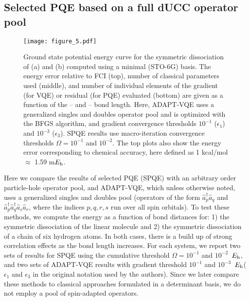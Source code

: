 \documentclass[aps,prx, reprint]{revtex4-2}
\newcommand*{\Eh}{$E_{\rm h}$\xspace}
\newcommand{\cop}[1]{\hat{a}^{\dagger}_{#1}}
\newcommand{\aop}[1]{\hat{a}_{#1}}
\begin{document}
\subsection{Selected PQE based on a full dUCC operator pool}
\begin{figure*}[ht!]
\centering
\texttt{[image: figure\_5.pdf]}
\caption{Ground state potential energy curve for the symmetric dissociation of (a)  and (b)  computed using a minimal (STO-6G) basis. The energy error relative to FCI (top), number of classical parameters used (middle), and number of individual elements of the gradient (for VQE) or residual (for PQE) evaluated (bottom) are given as a function of the -- and -- bond length. Here, ADAPT-VQE uses a generalized singles and doubles operator pool and is optimized with the BFGS algorithm, and gradient convergence thresholds $10^{-1}$ ($\epsilon_1$) and $10^{-3}$ ($\epsilon_3$). SPQE results use macro-iteration convergence thresholds $\Omega=10^{-1}$ and $10^{-2}$. The top plots also show the energy error corresponding to chemical accuracy, here defined as 1 kcal/mol $\approx$ 1.59 m\Eh.}
\label{fig:H6_BeH2_pes_compare}
\end{figure*}

Here we compare the results of selected PQE (SPQE) with an arbitrary order particle-hole operator pool, and ADAPT-VQE, which unless otherwise noted, uses a generalized singles and doubles pool (operators of the form $\cop{p}\aop{q}$ and $\cop{p}\cop{q}\aop{s}\aop{r}$, where the indices $p,q,r,s$ run over all spin orbitals).
To test these methods, we compute the energy as a function of bond distances for: 1) the symmetric dissociation of the linear  molecule and 2) the symmetric dissociation of a chain of six hydrogen atoms.
In both cases, there is a build up of strong correlation effects as the bond length increases.
For each system, we report two sets of results for SPQE using the cumulative threshold $\Omega = 10^{-1}$ and $10^{-2}$~\Eh, and two sets of ADAPT-VQE results with gradient threshold $10^{-1}$ and $10^{-3}$~\Eh ($\epsilon_1$ and $\epsilon_3$ in the original notation used by the authors).
Since we later compare these methods to classical approaches formulated in a determinant basis, we do not employ a pool of spin-adapted operators.
\end{document}
